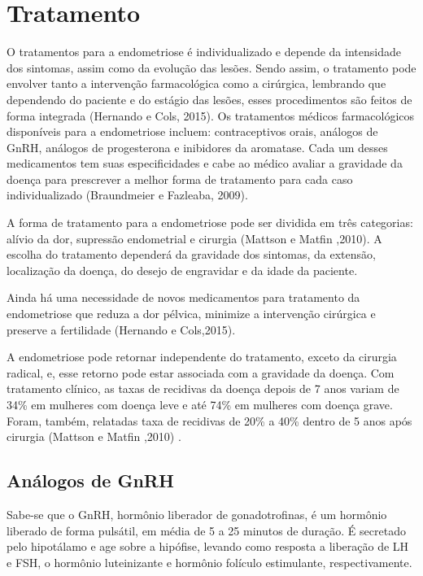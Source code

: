 \documentclass[12pt]{article} %
\begin{document}
\section{Tratamento} 

O tratamentos para a endometriose é individualizado e depende da
intensidade dos sintomas, assim como da evolução das lesões. Sendo
assim, o tratamento pode envolver tanto a intervenção farmacológica
como a cirúrgica, lembrando que dependendo do paciente e do estágio
das lesões, esses procedimentos são feitos de forma integrada (Hernando
e Cols, 2015). Os tratamentos médicos farmacológicos disponíveis para
a endometriose incluem: contraceptivos orais, análogos de GnRH,
análogos de progesterona e inibidores da aromatase. Cada um desses
medicamentos tem suas especificidades e cabe ao médico avaliar a
gravidade da doença para prescrever a melhor forma de tratamento para
cada caso individualizado (Braundmeier e Fazleaba, 2009).

A forma de tratamento para a endometriose pode ser dividida em três
categorias: alívio da dor, supressão endometrial e cirurgia (Mattson e
Matfin ,2010). A escolha do tratamento dependerá da gravidade dos
sintomas, da extensão, localização da doença, do desejo de engravidar
e da idade da paciente.

Ainda há uma necessidade de novos medicamentos para tratamento da
endometriose que reduza a dor pélvica, minimize a intervenção
cirúrgica e preserve a fertilidade (Hernando e Cols,2015).

A endometriose pode retornar independente do tratamento, exceto da
cirurgia radical, e, esse retorno pode estar associada com a gravidade
da doença. Com tratamento clínico, as taxas de recidivas da doença
depois de 7 anos variam de 34\% em mulheres com doença leve e até 74\%
em mulheres com doença grave. Foram, também, relatadas taxa de
recidivas de 20\% a 40\% dentro de 5 anos após cirurgia (Mattson e
Matfin ,2010) .

\subsection{Análogos de GnRH}

Sabe-se que o GnRH, hormônio liberador de gonadotrofinas, é um
hormônio liberado de forma pulsátil, em média de 5 a 25 minutos de
duração. É secretado pelo hipotálamo e age sobre a hipófise, levando
como resposta a liberação de LH e FSH, o hormônio luteinizante e
hormônio folículo estimulante, respectivamente.
\end{document}
